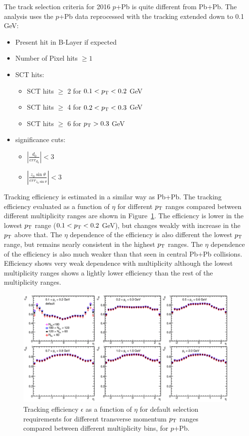 The track selection criteria for 2016 $p$+Pb is quite different from Pb+Pb. The analysis uses the $p$+Pb data reprocessed with the tracking extended down to 0.1 GeV:
\begin{itemize}
\item Present hit in B-Layer if expected
\item Number of Pixel hits $\geq 1$
\item SCT hits:
\begin{itemize}
\item SCT hits $\geq$ 2 for $0.1 < p_\text{T} < 0.2$ GeV
\item SCT hits $\geq$ 4 for $0.2 < p_\text{T} < 0.3$ GeV
\item SCT hits $\geq$ 6 for $p_\text{T} > 0.3$ GeV
\end{itemize}
\item significance cuts:
\begin{itemize}
\item $|\frac{d_0}{err_{d_0}}|<3$
\item $|\frac{z_0\sin\theta}{err_{z_0\sin\theta}}|<3$
\end{itemize}
\end{itemize}

Tracking efficiency is estimated in a similar way as Pb+Pb. The tracking efficiency evaluated as a function of $\eta$ for different $p_\text{T}$ ranges compared between different multiplicity ranges are shown in Figure~\ref{fig:detector_ATLAS_track_eff_pPb}. The efficiency is lower in the lowest $p_\text{T}$ range ($0.1<p_\text{T}<0.2$ GeV), but changes weakly with increase in the $p_\text{T}$ above that. The $\eta$ dependence of the efficiency is also different the lowest $p_\text{T}$ range, but remains nearly consistent in the highest $p_\text{T}$ ranges. The $\eta$ dependence of the efficiency is also much weaker than that seen in central Pb+Pb collisions. Efficiency shows very weak dependence with multiplicity although the lowest multiplicity ranges shows a lightly lower efficiency than the rest of the multiplicity ranges.

\begin{figure}[H]
\centering
\includegraphics[width=.95\linewidth]{figs/chapter_detector/ATLAS_track_eff_pPb.png}
\caption{Tracking efficiency $\epsilon$ as a function of $\eta$ for default selection requirements for different transverse momentum $p_\text{T}$ ranges compared between different multiplicity bins, for $p$+Pb.}
\label{fig:detector_ATLAS_track_eff_pPb}
\end{figure}



